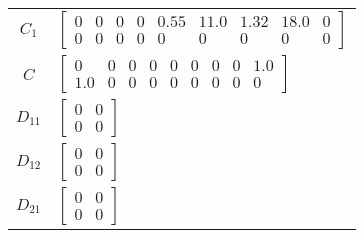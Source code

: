 \begin{tabular}{cl}
 $C_{1}$  & $\left[\begin{matrix}0 & 0 & 0 & 0 & 0.55 & 11.0 & 1.32 & 18.0 & 0\\0 & 0 & 0 & 0 & 0 & 0 & 0 & 0 & 0\end{matrix}\right]$                                                                                                                                                                                                                                                                                         \\
   $C$    & $\left[\begin{matrix}0 & 0 & 0 & 0 & 0 & 0 & 0 & 0 & 1.0\\1.0 & 0 & 0 & 0 & 0 & 0 & 0 & 0 & 0\end{matrix}\right]$                                                                                                                                                                                                                                                                                                 \\
 $D_{11}$ & $\left[\begin{matrix}0 & 0\\0 & 0\end{matrix}\right]$                                                                                                                                                                                                                                                                                                                                                             \\
 $D_{12}$ & $\left[\begin{matrix}0 & 0\\0 & 0\end{matrix}\right]$                                                                                                                                                                                                                                                                                                                                                             \\
 $D_{21}$ & $\left[\begin{matrix}0 & 0\\0 & 0\end{matrix}\right]$                                                                                                                                                                                                                                                                                                                                                             \\
\hline
\end{tabular}
